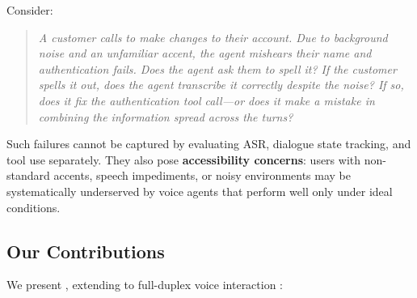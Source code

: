 Consider:

\begin{quote}
\textit{A customer calls to make changes to their account. Due to background noise and an unfamiliar accent, the agent mishears their name and authentication fails. Does the agent ask them to spell it? If the customer spells it out, does the agent transcribe it correctly despite the noise? If so, does it fix the authentication tool call---or does it make a mistake in combining the information spread across the turns?}
\end{quote}

Such failures cannot be captured by evaluating ASR, dialogue state tracking, and tool use separately. They also pose \textbf{accessibility concerns}: users with non-standard accents, speech impediments, or noisy environments may be systematically underserved by voice agents that perform well only under ideal conditions.

\subsection{Our Contributions}

We present \textbf{\tauvoice{}}, extending \tautwobench{} to full-duplex voice interaction :


